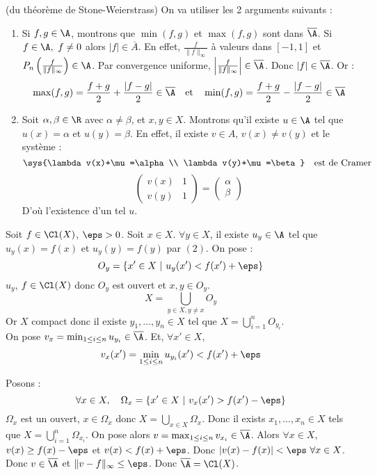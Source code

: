\prv (du théorème de Stone-Weierstrass)
\dl On va utiliser les 2 arguments suivants :
\begin{enumerate}
  \item Si $f,g\in\A$, montrons que $\min(f,g)$ et $\max(f,g)$ sont dans $\overline\A$.
    \dl Si $f\in\A,\ f\neq 0$ alors $|f|\in\overline A$. En effet, $\frac{f}{\|f\|_\infty}$ à valeurs dans $[-1,1]$ et $P_n\left(\frac{f}{\|f\|_\infty}\right)\in\A$. Par convergence uniforme, $\left|\frac{f}{\|f\|_\infty}\right|\in\overline\A$. Donc $|f|\in\overline\A$. Or :
    $$\max(f,g)=\frac{f+g}{2}+\frac{|f-g|}{2}\in\overline\A\quad\text{et}\quad\min(f,g)=\frac{f+g}{2}-\frac{|f-g|}{2}\in\overline\A$$
  
  \item Soit $\alpha,\beta\in\R$ avec $\alpha\neq\beta$, et $x,y\in X$. Montrons qu'il existe $u\in\A$ tel que $u(x)=\alpha$ et $u(y)=\beta$.
    \dl En effet, il existe $v\in A$, $v(x)\neq v(y)$ et le système :
    $$\sys{\lambda v(x)+\mu=\alpha\\ \lambda v(y)+\mu=\beta}\quad\text{est de Cramer}$$
    $$\begin{pmatrix} v(x) & 1\\v(y)&1\end{pmatrix}=\begin{pmatrix}\alpha\\\beta\end{pmatrix}$$
    D'où l'existence d'un tel $u$.
\end{enumerate}
Soit $f\in\Cl(X)$, $\eps>0$. Soit $x\in X$. $\forall y\in X$, il existe $u_y\in\A$ tel que $u_y(x)=f(x)$ et $u_y(y)=f(y)$ par $(2)$. On pose :
$$O_y=\{x'\in X\ |\ u_y(x')<f(x')+\eps\}$$
$u_y$, $f\in\Cl(X)$ donc $O_y$ est ouvert et $x,y\in O_y$.
$$X=\bigcup_{y\in X, y\neq x}O_y$$
Or $X$ compact donc il existe $y_1,...,y_n\in X$ tel que $X=\bigcup_{i=1}^n O_{y_i}$. 
\\ On pose $v_x=\min_{1\le i\le n}u_{y_i}\in\overline\A$. Et, $\forall x'\in X$, 
$$v_x(x')=\min_{1\le i\le n}u_{y_i}(x')<f(x')+\eps$$

\dd Posons :
$$\forall x\in X,\quad \Omega_x=\{x'\in X\ |\ v_x(x')>f(x')-\eps\}$$
$\Omega_x$ est un ouvert, $x\in\Omega_x$ donc $X=\bigcup_{x\in X}\Omega_x$. Donc il exists $x_1,...,x_n\in X$ tels que $X=\bigcup_{i=1}^n\Omega_{x_i}$. 
\dd On pose alors $v=\max_{1\le i\le n}v_{x_i}\in\overline\A$.
\dl Alors $\forall x\in X$, $v(x)\ge f(x)-\eps$ et $v(x)<f(x)+\eps$. Donc $|v(x)-f(x)|<\eps\ \forall x\in X$. Donc $v\in\overline\A$ et $\|v-f\|_\infty\le\eps$. Donc $\overline\A=\Cl(X)$.
\prvf

